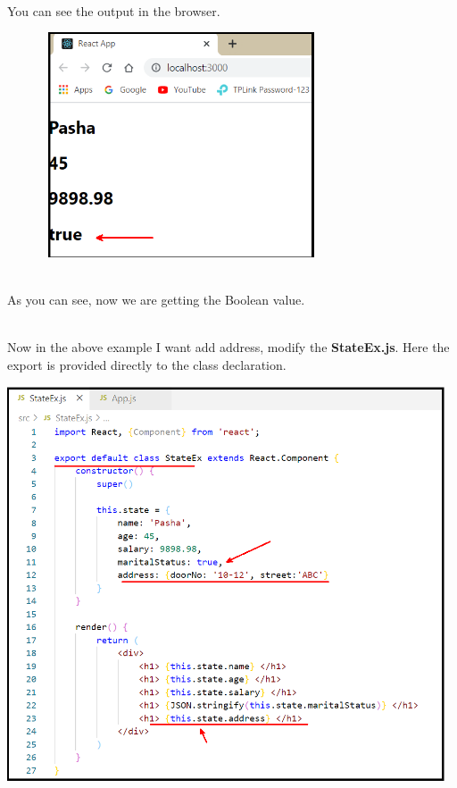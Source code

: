 \documentclass{article}
\begin{document}
\noindent 

\noindent \\
You can see the output in the browser.

\begin{center}
	\noindent \includegraphics*[width=4.06in, height=2.62in]{IMG-09-06}
\end{center}

\noindent 

\noindent 

\noindent \\
As you can see, now we are getting the Boolean value.

\noindent 

\noindent 

\noindent 

\noindent 

\noindent 

\noindent \\
Now in the above example I want add address, modify the \textbf{StateEx.js}. Here the export is provided directly to the class declaration.

\begin{center}
	\noindent \includegraphics*[width=5.10in, height=4.60in]{IMG-09-07}
\end{center}
\end{document}
